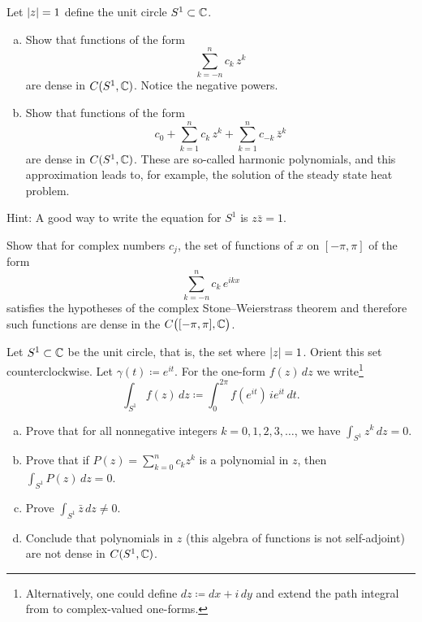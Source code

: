 \begin{exercise}
\pagebreak[3]
Let $\lvert {z} \rvert=1$ define the unit circle $S^1 \subset {\mathbb{C}}$.
\begin{enumerate}[a)]
\item
Show that functions of the form
\begin{equation*}
\sum_{k=-n}^n c_k\, z^k
\end{equation*}
are dense in $C(S^1,{\mathbb{C}})$.  Notice the negative powers.
\item 
Show that functions of the form
\begin{equation*}
c_0
+
\sum_{k=1}^n c_k \, z^k
+
\sum_{k=1}^n c_{-k}\, \bar{z}^k
\end{equation*}
are dense in $C(S^1,{\mathbb{C}})$.  These are so-called harmonic polynomials,
and this approximation leads to, for example, the solution of the
steady state heat problem.
\end{enumerate}
Hint: A good way to write the equation for $S^1$ is $z \bar{z} = 1$.
\end{exercise}

\begin{exercise}
Show that for complex numbers $c_j$, the set of functions
of $x$ on $[-\pi,\pi]$
of the form
\begin{equation*}
\sum_{k=-n}^n c_k \, e^{ik x}
\end{equation*}
satisfies the hypotheses of the complex Stone--Weierstrass theorem
and therefore such functions are dense in the $C\bigl([-\pi,\pi],{\mathbb{C}}\bigr)$.
\end{exercise}

\begin{exercise} \label{exercise:selfadjointSW}
Let $S^1 \subset {\mathbb{C}}$ be the unit circle, that is, the set where
$\lvert {z} \rvert = 1$.  Orient this set counterclockwise.
Let $\gamma(t) \coloneqq e^{it}$.
For the one-form $f(z)\,dz$ we write\footnote{%
Alternatively, one could define $dz \coloneqq dx + i \, dy$ and
extend the path integral from  to complex-valued
one-forms.}
\begin{equation*}
\int_{S^1} f(z) \,dz \coloneqq \int_0^{2\pi} f(e^{it}) \, i e^{it} \, dt . 
\end{equation*}
\begin{enumerate}[a)]
\item
Prove that for all nonnegative integers $k = 0,1,2,3,\ldots$, we have
$\int_{S^1} z^k \, dz = 0$.
\item
Prove that if
$P(z) = \sum_{k=0}^n c_k z^k$ is a
polynomial in $z$, then
$\int_{S^1} P(z) \, dz = 0$.
\item
Prove
$\int_{S^1} \bar{z} \, dz \not= 0$.
\item
Conclude that polynomials in $z$ (this algebra of functions is
not self-adjoint) are not dense in $C(S^1,{\mathbb{C}})$.
\end{enumerate}
\end{exercise}

